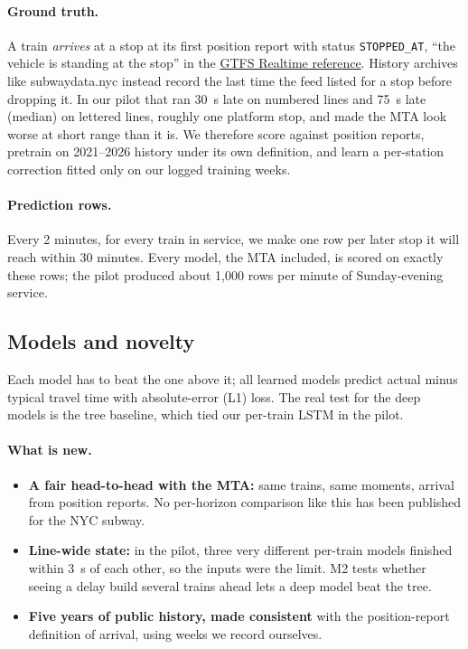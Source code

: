 \documentclass[10pt,letterpaper,twocolumn]{article}
\begin{document}
\paragraph{Ground truth.} A train \emph{arrives} at a stop at its first position report with status \texttt{STOPPED\_AT}, ``the vehicle is standing at the stop'' in the \href{https://gtfs.org/documentation/realtime/reference/}{GTFS Realtime reference}. History archives like subwaydata.nyc instead record the last time the feed listed for a stop before dropping it. In our pilot that ran 30~s late on numbered lines and 75~s late (median) on lettered lines, roughly one platform stop, and made the MTA look worse at short range than it is. We therefore score against position reports, pretrain on 2021--2026 history under its own definition, and learn a per-station correction fitted only on our logged training weeks.

\paragraph{Prediction rows.} Every 2 minutes, for every train in service, we make one row per later stop it will reach within 30 minutes. Every model, the MTA included, is scored on exactly these rows; the pilot produced about 1,000 rows per minute of Sunday-evening service.

\subsection{Models and novelty}

Each model has to beat the one above it; all learned models predict actual minus typical travel time with absolute-error (L1) loss. The real test for the deep models is the tree baseline, which tied our per-train LSTM in the pilot.

\paragraph{What is new.}
\begin{itemize}
  \item \textbf{A fair head-to-head with the MTA:} same trains, same moments, arrival from position reports. No per-horizon comparison like this has been published for the NYC subway.
  \item \textbf{Line-wide state:} in the pilot, three very different per-train models finished within 3~s of each other, so the inputs were the limit. M2 tests whether seeing a delay build several trains ahead lets a deep model beat the tree.
  \item \textbf{Five years of public history, made consistent} with the position-report definition of arrival, using weeks we record ourselves.
\end{itemize}
\end{document}
